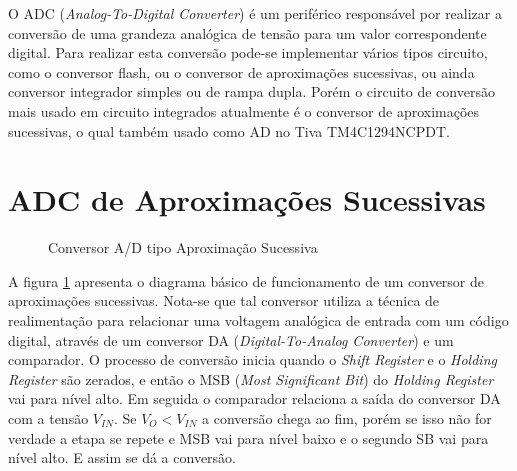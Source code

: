 O ADC (\emph{Analog-To-Digital Converter}) é um periférico responsável por realizar a conversão de uma grandeza analógica de tensão para um valor correspondente digital. Para realizar esta conversão pode-se implementar vários  tipos circuito, como o conversor flash, ou o conversor de aproximações sucessivas, ou ainda conversor integrador simples ou de rampa dupla. Porém o  circuito de conversão mais usado em circuito integrados atualmente é o conversor de aproximações sucessivas, o qual também usado como AD no Tiva TM4C1294NCPDT. 


\section{ADC de Aproximações Sucessivas}

\begin{figure}[H]
	\centering
	\caption{Conversor A/D tipo Aproximação Sucessiva}
	\label{fig:ConversorAD}
\end{figure}

 A figura \ref{fig:ConversorAD} apresenta o diagrama básico de funcionamento de um conversor de aproximações sucessivas. Nota-se que tal conversor utiliza a técnica de realimentação para relacionar uma voltagem analógica de entrada com um código digital, através de um conversor DA (\emph{Digital-To-Analog Converter}) e um comparador. O processo de conversão inicia quando o \emph{Shift Register} e o \emph{Holding Register} são zerados, e então o MSB (\emph{Most Significant Bit}) do \emph{Holding Register} vai para nível alto. Em seguida o comparador relaciona a saída do conversor DA com a tensão $V_{IN}$. Se $V_{O} < V_{IN}$ a conversão chega ao fim, porém se isso não for verdade a etapa se repete e MSB vai para nível baixo e o segundo SB vai para nível alto. E assim se dá a conversão. 

